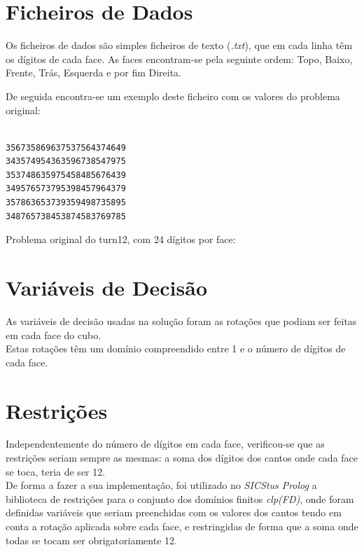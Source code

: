 %
%
%

\section{Ficheiros de Dados}
\label{data:1}

Os ficheiros de dados são simples ficheiros de texto (\textit{.txt}), que em cada linha têm os dígitos de cada face.
As faces encontram-se pela seguinte ordem: Topo, Baixo, Frente, Trás, Esquerda e por fim Direita.

De seguida encontra-se um exemplo deste ficheiro com os valores do problema original:

\begin{f_exemplo}[H]
\begin{verbatim}

356735869637537564374649
343574954363596738547975
353748635975458485676439
349576573795398457964379
357863653739359498735895
348765738453874583769785
\end{verbatim}
\caption{Problema original do turn12, com 24 dígitos por face:}
\end{f_exemplo}



\section{Variáveis de Decisão}
\label{restr:1}

As variáveis de decisão usadas na solução foram as rotações que podiam ser feitas em cada face do cubo.\\
Estas rotações têm um domínio compreendido entre 1 e o número de dígitos de cada face.

\section{Restrições}
\label{restr:2}

Independentemente do número de dígitos em cada face, verificou-se que as restrições seriam sempre as mesmas: a soma dos dígitos dos cantos onde cada face se toca, teria de ser 12.\\

De forma a fazer a sua implementação, foi utilizado no \textit{SICStus Prolog} a biblioteca de restrições para o conjunto dos domínios finitos \textit{clp(FD)}, onde foram definidas variáveis que seriam preenchidas com os valores dos cantos tendo em conta a rotação aplicada sobre cada face, e restringidas de forma que a soma onde todas se tocam ser obrigatoriamente 12.

